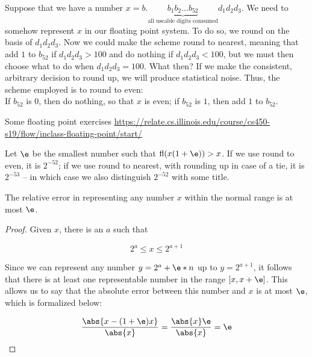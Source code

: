 \documentclass[../main.tex]{subfiles}
\begin{document}
\begin{definition}
    Suppose that we have a number $x = b.\underbrace{b_1b_2\dots b_{52}}_{\text{all useable digits consumed}}d_1d_2d_3$. We need to somehow represent
    $x$ in our floating point system. To do so, we round on the basis of $d_1d_2d_3$. Now we could make the scheme round to nearest, meaning that
    add $1$ to $b_{52}$ if $d_1d_2d_3 > 100$ and do nothing if $d_1d_2d_3 < 100$, but we must then choose what to do when $d_1d_2d_3 = 100$. What
    then? If we make the consistent, arbitrary decision to round up, we will produce statistical noise. Thus, the scheme employed is to round to even: \\

    If $b_{52}$ is 0, then do nothing, so that $x$ is even; if $b_{52}$ is $1$, then add $1$ to $b_{52}$.
\end{definition}



\begin{remark}
    Some floating point exercises \url{https://relate.cs.illinois.edu/course/cs450-s19/flow/inclass-floating-point/start/}
\end{remark}

\begin{definition}
    Let $\e$ be the smallest number such that $\text{fl}(x(1 + \e)) > x$. If we use round to even, it is $2^{-52}$; if we use round to nearest,
    with rounding up in case of a tie, it is $2^{-53}$ -- in which case we also distinguish $2^{-52}$ with some title.
\end{definition}

\begin{lemma}
    The relative error in representing any number $x$ within the normal range is at most $\e$.
\end{lemma}

\begin{proof}
    Given $x$, there is an $a$ such that

    \[
        2^{a} \leq x \leq 2^{a+1}
    \]

    Since we can represent any number $y = 2^{a} + \e * n$ up
    to $y = 2^{a+1}$, it follows that there is at least one representable number in the range $[x, x + \e]$. This allows us to say that the absolute error between this number and $x$ is at most $\e$, which is formalized below:


    \[
        \frac{\abs{x - (1 + \e)x}}{\abs{x}} = \frac{\abs{x} \e}{\abs{x}} = \e
    \]
\end{proof}
\end{document}
